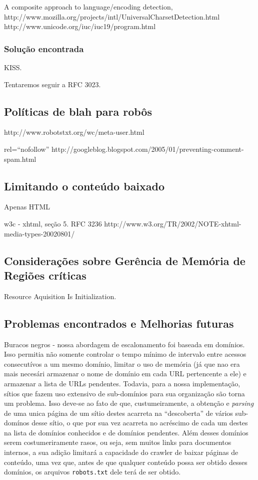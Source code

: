 \documentclass[10pt,twocolumn]{article}
\begin{document}
A composite approach to language/encoding detection,
    http://www.mozilla.org/projects/intl/UniversalCharsetDetection.html
    http://www.unicode.org/iuc/iuc19/program.html

\subsubsection{Solução encontrada}

KISS.

Tentaremos seguir a RFC 3023.
\subsection{Políticas de blah para robôs}
http://www.robotstxt.org/wc/meta-user.html

rel=``nofollow'' http://googleblog.blogspot.com/2005/01/preventing-comment-spam.html  



\subsection{Limitando o conteúdo baixado}

Apenas HTML 

w3c - xhtml, seção 5.
RFC 3236
http://www.w3.org/TR/2002/NOTE-xhtml-media-types-20020801/

\subsection{Considerações sobre Gerência de Memória de Regiões críticas}

Resource Aquisition Is Initialization.

\subsection{Problemas encontrados e Melhorias futuras}

Buracos negros - nossa abordagem de escalonamento foi baseada em domínios. Isso
permitia não somente controlar o tempo mínimo de intervalo entre acessos
consecutívos a um mesmo domínio, limitar o uso de memória (já que nao era mais
necesári armazenar o nome de domínio em cada URL pertencente a ele) e armazenar
a lista de URLs pendentes. Todavia, para a nossa implementação, sítios que
fazem uso extensivo de sub-domínios para sua organização são torna um problema.
Isso deve-se ao fato de que, custumeiramente, a obtenção e \emph{parsing} de
uma unica página de um sítio destes acarreta na ``descoberta'' de vários
sub-domínos desse sítio, o que por sua vez acarreta no acréscimo de cada um
destes na lista de domínios conhecidos e de domínios pendentes. Além desses
domínios serem costumeriramente rasos, ou seja, sem muitos links para
documentos internos, a sua adição limitará a capacidade do crawler de baixar
páginas de conteúdo, uma vez que, antes de que qualquer conteúdo possa ser
obtido desses domínios, os arquivos \texttt{robots.txt} dele terá de ser
obtido.
\end{document}
